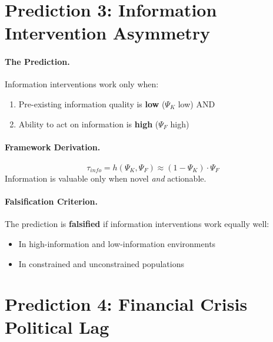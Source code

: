 \section{Prediction 3: Information Intervention Asymmetry}
\label{sec:S-prediction3}

\paragraph{The Prediction.}
Information interventions work only when:
\begin{enumerate}
    \item Pre-existing information quality is \textbf{low} ($\Psi_K$ low) AND
    \item Ability to act on information is \textbf{high} ($\Psi_F$ high)
\end{enumerate}

\paragraph{Framework Derivation.}
\begin{equation}
    \tau_{info} = h(\Psi_K, \Psi_F) \approx (1 - \Psi_K) \cdot \Psi_F
\end{equation}
Information is valuable only when novel \textit{and} actionable.

\paragraph{Falsification Criterion.}
The prediction is \textbf{falsified} if information interventions work equally well:
\begin{itemize}
    \item In high-information and low-information environments
    \item In constrained and unconstrained populations
\end{itemize}


\section{Prediction 4: Financial Crisis Political Lag}
\label{sec:S-prediction4}


